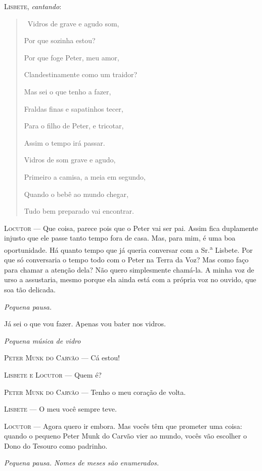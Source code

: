\begin{myparindent}{0pt}
\begin{Parskip}
\textsc{Lisbete}, \emph{cantando}:

\begin{quote}
\quad \, Vidros de grave e agudo som, \smallskip

Por que sozinha estou? \smallskip

Por que foge Peter, meu amor, \smallskip

Clandestinamente como um traidor? \smallskip

Mas sei o que tenho a fazer, \smallskip

Fraldas finas e sapatinhos tecer, \smallskip

Para o filho de Peter, e tricotar, \smallskip

Assim o tempo irá passar. \smallskip

Vidros de som grave e agudo, \smallskip

Primeiro a camisa, a meia em segundo, \smallskip

Quando o bebê ao mundo chegar, \smallskip

Tudo bem preparado vai encontrar. \smallskip

\end{quote}

\textsc{Locutor} --- Que coisa, parece pois que o Peter vai ser pai. Assim fica
duplamente injusto que ele passe tanto tempo fora de casa. Mas, para
mim, é uma boa oportunidade. Há quanto tempo que já queria conversar com
a Sr.\textsuperscript{a} Lisbete. Por que só conversaria o tempo todo
com o Peter na Terra da Voz? Mas como faço para chamar a atenção dela?
Não quero simplesmente chamá-la. A minha voz de urso a assustaria, mesmo
porque ela ainda está com a própria voz no ouvido, que soa tão delicada.

\emph{Pequena pausa.}

Já sei o que vou fazer. Apenas vou bater nos vidros.

\emph{Pequena música de vidro}

\textsc{Peter Munk do Carvão} --- Cá estou!

\textsc{Lisbete e Locutor} --- Quem é?

\textsc{Peter Munk do Carvão} --- Tenho o meu coração de volta.

\textsc{Lisbete} --- O meu você sempre teve.

\textsc{Locutor} --- Agora quero ir embora. Mas vocês têm que prometer uma coisa:
quando o pequeno Peter Munk do Carvão vier ao mundo, vocês vão escolher
o Dono do Tesouro como padrinho.

\emph{Pequena pausa. Nomes de meses são enumerados.}


\end{Parskip}
\end{myparindent}
